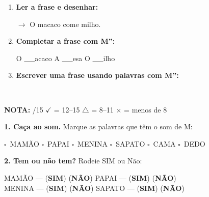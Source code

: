 \begin{exercicio}
\begin{enumerate}[resume]
  \item \textbf{Ler a frase e desenhar:}
  \begin{center}
  $\rightarrow$ O macaco come milho.
  \end{center}
  \begin{center}
  \end{center}

  \item \textbf{Completar a frase com M'':}
  \begin{center}
  O \underline{~~~}acaco \quad A \underline{~~~}esa \quad O \underline{~~~}ilho
  \end{center}

  \item \textbf{Escrever uma frase usando palavras com M'':}
  \begin{center}
  \underline{\hspace{12cm}} \\
  \underline{\hspace{12cm}}
  \end{center}
\end{enumerate}

\noindent\textbf{NOTA:} \underline{\hspace{1cm}}/15 \quad $\checkmark$ = 12--15 \quad $\triangle$ = 8--11 \quad $\times$ = menos de 8
\end{exercicio}

\begin{somletra}[title={\faMusic~Atividade de Som da Letra --- B\^onus (n\~ao vale nota)}]
\textbf{1. Ca\c{c}a ao som.} Marque as palavras que t\^e{}m o som de M:
\begin{center}
$\square$~MAM\~AO \quad $\square$~PAPAI \quad $\square$~MENINA \quad $\square$~SAPATO \quad $\square$~CAMA \quad $\square$~DEDO
\end{center}

\textbf{2. Tem ou n\~ao{} tem?} Rodeie SIM ou N\~ao:
\begin{center}
MAM\~AO --- (\textbf{SIM}) (\textbf{N\~AO}) \quad PAPAI --- (\textbf{SIM}) (\textbf{N\~AO}) \\ MENINA --- (\textbf{SIM}) (\textbf{N\~AO}) \quad SAPATO --- (\textbf{SIM}) (\textbf{N\~AO})
\end{center}
\end{somletra}

